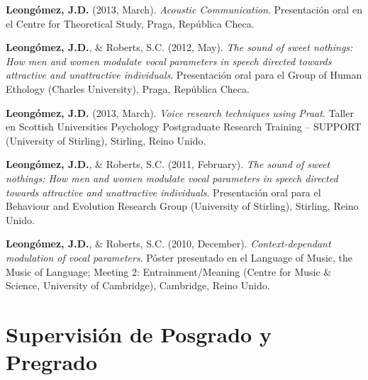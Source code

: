 \documentclass[11pt, a4paper]{awesome-cv}
\begin{document}
\textbf{Leongómez, J.D.} (2013, March). \emph{Acoustic Communication}. Presentación oral en el Centre for Theoretical Study, Praga, República Checa.

\textbf{Leongómez, J.D.}, \& Roberts, S.C. (2012, May). \emph{The sound of sweet nothings: How men and women modulate vocal parameters in speech directed towards attractive and unattractive individuals}. Presentación oral para el Group of Human Ethology (Charles University), Praga, República Checa.

\textbf{Leongómez, J.D.} (2013, March). \emph{Voice research techniques using Praat}. Taller en Scottish Universities Psychology Postgraduate Research Training -- SUPPORT (University of Stirling), Stirling, Reino Unido.

\textbf{Leongómez, J.D.}, \& Roberts, S.C. (2011, February). \emph{The sound of sweet nothings: How men and women modulate vocal parameters in speech directed towards attractive and unattractive individuals}. Presentación oral para el Behaviour and Evolution Research Group (University of Stirling), Stirling, Reino Unido.

\textbf{Leongómez, J.D.}, \& Roberts, S.C. (2010, December). \emph{Context-dependant modulation of vocal parameters}. Póster presentado en el Language of Music, the Music of Language; Meeting 2: Entrainment/Meaning (Centre for Music \& Science, University of Cambridge), Cambridge, Reino Unido.

\endgroup

\hypertarget{supervisiuxf3n-de-posgrado-y-pregrado}{%
\section{Supervisión de Posgrado y Pregrado}\label{supervisiuxf3n-de-posgrado-y-pregrado}}
\end{document}
